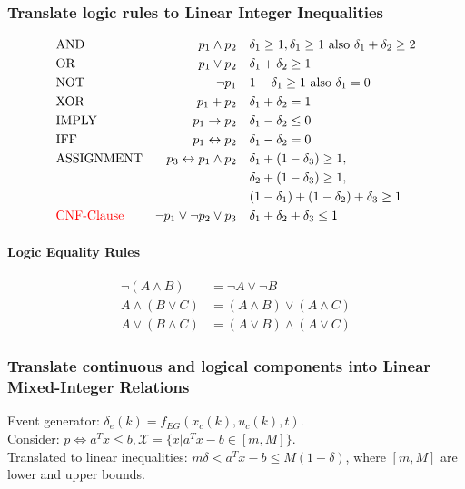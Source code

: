 \documentclass[landscape,a4paper,8pt]{scrartcl}
\newcommand{\remph}[1]{{\textcolor{red}{#1}}}
\begin{document}
\begin{multicols*}{3}
\subsubsection{Translate logic rules to Linear Integer Inequalities}\vspace*{-\baselineskip}
\begin{align*}
&\text{AND} &p_1 \wedge p_2 \quad &\delta_1 \geq 1, \delta_1 \geq 1\text{ also } \delta_1 + \delta_2 \geq 2 \\
&\text{OR} &p_1 \vee p_2 \quad &\delta_1 + \delta_2 \geq 1 \\
&\text{NOT} &\neg p_1 \quad &1-\delta_1 \geq 1 \text{ also } \delta_1 = 0 \\
&\text{XOR} &p_1 + p_2 \quad &\delta_1 + \delta_2 = 1 \\
&\text{IMPLY} &p_1 \rightarrow p_2 \quad &\delta_1 - \delta_2 \leq 0 \\
&\text{IFF} &p_1 \leftrightarrow p_2 \quad &\delta_1 - \delta_2 = 0 \\
&\text{ASSIGNMENT} &p_3 \leftrightarrow p_1 \wedge p_2 \quad & \delta_1 + (1 - \delta_3) \geq 1, \\
& & &\delta_2 + (1 - \delta_3) \geq 1, \\
& & &(1 - \delta_1) + (1 - \delta_2) + \delta_3 \geq 1 \\
&\remph{\text{CNF-Clause}} & \neg p_1 \vee \neg p_2 \vee p_3 \quad & \delta_1 + \delta_2 + \delta_3 \leq 1
\end{align*}
\paragraph{Logic Equality Rules}
\begin{align*}
 \neg (A \wedge B) & = \neg A \vee \neg B \\
A \wedge (B \vee C) & = (A \wedge B) \vee (A\wedge C) \\
A \vee (B \wedge C) & = (A\vee B)\wedge (A \vee C)
\end{align*}
\subsubsection{Translate continuous and logical components into Linear Mixed-Integer Relations}
Event generator: $\delta_e(k) = f_{EG}(x_c(k), u_c(k), t)$. \\
Consider: $p \Leftrightarrow a^Tx \leq b, \mathcal X = \{x | a^T x-b \in [m, M]\}$. \\
Translated to linear inequalities: $ m \delta < a^T x-b \leq M(1-\delta)$, where $[m, M]$ are lower and upper bounds. \\

\end{multicols*}
\end{document}
